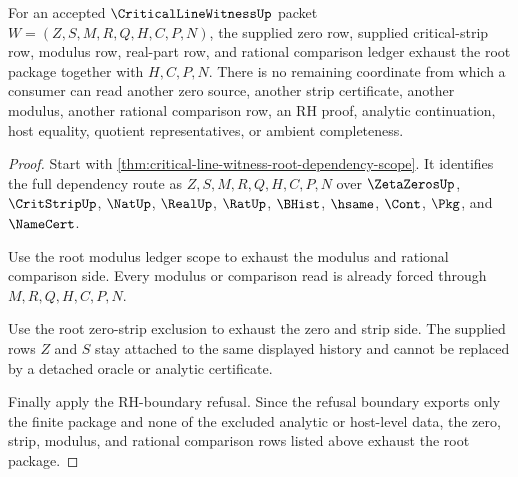 \begin{theorem}
\label{thm:critical-line-witness-zero-strip-modulus-package-exhaustion}
For an accepted $\CriticalLineWitnessUp$ packet
$W=(Z,S,M,R,Q,H,C,P,N)$, the supplied zero row, supplied critical-strip row,
modulus row, real-part row, and rational comparison ledger exhaust the root
package together with $H,C,P,N$. There is no remaining coordinate from which a
consumer can read another zero source, another strip certificate, another
modulus, another rational comparison row, an RH proof, analytic continuation,
host equality, quotient representatives, or ambient completeness.
\end{theorem}
\begin{proof}
Start with \autoref{thm:critical-line-witness-root-dependency-scope}. It
identifies the full dependency route as
$Z,S,M,R,Q,H,C,P,N$ over $\ZetaZerosUp$, $\CritStripUp$, $\NatUp$, $\RealUp$,
$\RatUp$, $\BHist$, $\hsame$, $\Cont$, $\Pkg$, and $\NameCert$.

Use the root modulus ledger scope to exhaust the modulus and rational
comparison side. Every modulus or comparison read is already forced through
$M,R,Q,H,C,P,N$.

Use the root zero-strip exclusion to exhaust the zero and strip side. The
supplied rows $Z$ and $S$ stay attached to the same displayed history and cannot
be replaced by a detached oracle or analytic certificate.

Finally apply the RH-boundary refusal. Since the refusal boundary exports only
the finite package and none of the excluded analytic or host-level data, the
zero, strip, modulus, and rational comparison rows listed above exhaust the
root package.
\end{proof}
